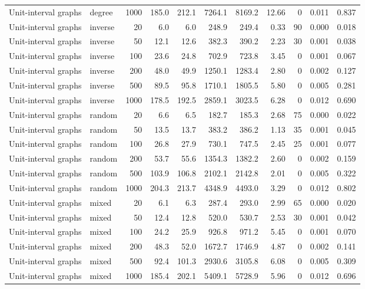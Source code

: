 \begin{tabular}{llrrrrrrrrr}
Unit-interval graphs & degree & 1000 & 185.0 & 212.1 & 7264.1 & 8169.2 & 12.66 & 0 & 0.011 & 0.837 \\
Unit-interval graphs & inverse & 20 & 6.0 & 6.0 & 248.9 & 249.4 & 0.33 & 90 & 0.000 & 0.018 \\
Unit-interval graphs & inverse & 50 & 12.1 & 12.6 & 382.3 & 390.2 & 2.23 & 30 & 0.001 & 0.038 \\
Unit-interval graphs & inverse & 100 & 23.6 & 24.8 & 702.9 & 723.8 & 3.45 & 0 & 0.001 & 0.067 \\
Unit-interval graphs & inverse & 200 & 48.0 & 49.9 & 1250.1 & 1283.4 & 2.80 & 0 & 0.002 & 0.127 \\
Unit-interval graphs & inverse & 500 & 89.5 & 95.8 & 1710.1 & 1805.5 & 5.80 & 0 & 0.005 & 0.281 \\
Unit-interval graphs & inverse & 1000 & 178.5 & 192.5 & 2859.1 & 3023.5 & 6.28 & 0 & 0.012 & 0.690 \\
Unit-interval graphs & random & 20 & 6.6 & 6.5 & 182.7 & 185.3 & 2.68 & 75 & 0.000 & 0.022 \\
Unit-interval graphs & random & 50 & 13.5 & 13.7 & 383.2 & 386.2 & 1.13 & 35 & 0.001 & 0.045 \\
Unit-interval graphs & random & 100 & 26.8 & 27.9 & 730.1 & 747.5 & 2.45 & 25 & 0.001 & 0.077 \\
Unit-interval graphs & random & 200 & 53.7 & 55.6 & 1354.3 & 1382.2 & 2.60 & 0 & 0.002 & 0.159 \\
Unit-interval graphs & random & 500 & 103.9 & 106.8 & 2102.1 & 2142.8 & 2.01 & 0 & 0.005 & 0.322 \\
Unit-interval graphs & random & 1000 & 204.3 & 213.7 & 4348.9 & 4493.0 & 3.29 & 0 & 0.012 & 0.802 \\
Unit-interval graphs & mixed & 20 & 6.1 & 6.3 & 287.4 & 293.0 & 2.99 & 65 & 0.000 & 0.020 \\
Unit-interval graphs & mixed & 50 & 12.4 & 12.8 & 520.0 & 530.7 & 2.53 & 30 & 0.001 & 0.042 \\
Unit-interval graphs & mixed & 100 & 24.2 & 25.9 & 926.8 & 971.2 & 5.45 & 0 & 0.001 & 0.070 \\
Unit-interval graphs & mixed & 200 & 48.3 & 52.0 & 1672.7 & 1746.9 & 4.87 & 0 & 0.002 & 0.141 \\
Unit-interval graphs & mixed & 500 & 92.4 & 101.3 & 2930.6 & 3105.8 & 6.08 & 0 & 0.005 & 0.309 \\
Unit-interval graphs & mixed & 1000 & 185.4 & 202.1 & 5409.1 & 5728.9 & 5.96 & 0 & 0.012 & 0.696 \\

\end{tabular}
